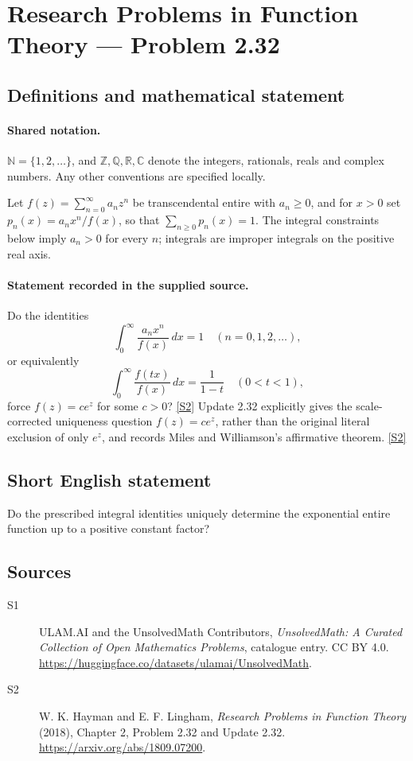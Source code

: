 \documentclass[11pt]{article}
\newcommand{\sref}[2]{\hyperlink{source:#1:#2}{[S#2]}}
\begin{document}
\section{Research Problems in Function Theory — Problem 2.32}\label{statement}

\subsection{Definitions and mathematical statement}

\paragraph{Shared notation.}$\mathbb N=\{1,2,\ldots\}$, and $\mathbb Z,\mathbb Q,\mathbb R,\mathbb C$ denote the integers, rationals, reals and complex numbers. Any other conventions are specified locally.


Let $f(z)=\sum_{n=0}^\infty a_nz^n$ be transcendental entire with $a_n\ge0$, and for $x>0$ set $p_n(x)=a_nx^n/f(x)$, so that $\sum_{n\ge0}p_n(x)=1$.
The integral constraints below imply $a_n>0$ for every $n$; integrals are improper integrals on the positive real axis.

\paragraph{Statement recorded in the supplied source.}
Do the identities
\[\int_0^\infty \frac{a_nx^n}{f(x)}\,dx=1\quad(n=0,1,2,\ldots),\]
or equivalently
\[\int_0^\infty \frac{f(tx)}{f(x)}\,dx=\frac1{1-t}\quad(0<t<1),\]
force $f(z)=ce^z$ for some $c>0$? \sref{statement}{2}
Update 2.32 explicitly gives the scale-corrected uniqueness question $f(z)=ce^z$, rather than the original literal exclusion of only $e^z$, and records Miles and Williamson's affirmative theorem. \sref{statement}{2}
\subsection{Short English statement}
Do the prescribed integral identities uniquely determine the exponential entire function up to a positive constant factor?
\subsection{Sources}
\begin{description}
\item[\hypertarget{source:statement:1}{S1}] ULAM.AI and the UnsolvedMath Contributors, \emph{UnsolvedMath: A Curated Collection of Open Mathematics Problems}, catalogue entry. CC BY 4.0. \url{https://huggingface.co/datasets/ulamai/UnsolvedMath}.
\item[\hypertarget{source:statement:2}{S2}] W. K. Hayman and E. F. Lingham, \emph{Research Problems in Function Theory} (2018), Chapter 2, Problem 2.32 and Update 2.32. \url{https://arxiv.org/abs/1809.07200}.
\end{description}
\label{end:statement}
\end{document}
